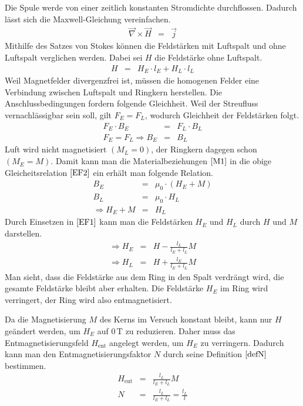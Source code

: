 \documentclass[12pt,a4paper]{scrartcl}
\numberwithin{equation}{section} %
\newcommand{\pu}[1]{\ensuremath{\mathrm{#1}}}
\renewcommand{\[}{} %
\renewcommand{\]}{\noindent} %
\begin{document}
Die Spule werde von einer zeitlich konstanten Stromdichte durchflossen. Dadurch lässt sich die Maxwell-Gleichung vereinfachen.
\begin{eqnarray}
    \vec \nabla \times \vec H &=& \vec j
\end{eqnarray}
Mithilfe des Satzes von Stokes können die Feldstärken mit Luftspalt und ohne Luftspalt verglichen werden. Dabei sei \(H\) die Feldstärke ohne Luftspalt. 
\begin{eqnarray}
    H &=& H_E\cdot l_E + H_L \cdot l_L \label{EF1}
\end{eqnarray}
Weil Magnetfelder divergenzfrei ist, müssen die homogenen Felder eine Verbindung zwischen Luftspalt und Ringkern herstellen. Die Anschlussbedingungen fordern folgende Gleichheit. Weil der Streufluss vernachlässigbar sein soll, gilt \(F_E = F_L\), wodurch Gleichheit der Feldstärken folgt.
\begin{eqnarray}
    F_E\cdot B_E &=& F_L\cdot B_L \nonumber \\
    F_E = F_L \Rightarrow B_E &=& B_L \label{EF2}
\end{eqnarray}
Luft wird nicht magnetisiert \((M_L=0)\), der Ringkern dagegen schon \((M_E=M)\). Damit kann man die Materialbeziehungen \(\eqref{M1}\) in die obige Gleicheitsrelation \(\eqref{EF2}\) ein erhält man folgende Relation.
\begin{eqnarray}
    B_E &=& \mu_0 \cdot \left(H_E + M\right) \nonumber \\
    B_L &=& \mu_0 \cdot H_L \nonumber \\
    \Rightarrow H_E + M &=& H_L \label{EF3}
\end{eqnarray}
Durch Einsetzen in \(\eqref{EF1}\) kann man die Feldstärken \(H_E\) und \(H_L\) durch \(H\) und \(M\) darstellen. 
\begin{eqnarray}
    \Rightarrow H_E &=& H - \frac{l_L}{l_E+l_L} M \\
    \Rightarrow H_L &=& H + \frac{l_E}{l_E+l_L} M
\end{eqnarray}
Man sieht, dass die Feldstärke aus dem Ring in den Spalt verdrängt wird, die gesamte Feldstärke bleibt aber erhalten. Die Feldstärke \(H_E\) im Ring wird verringert, der Ring wird also entmagnetisiert.

Da die Magnetisierung \(M\) des Kerns im Versuch konstant bleibt, kann nur \(H\) geändert werden, um \(H_E\) auf \(\pu{0\,T}\) zu reduzieren. Daher muss das Entmagnetisierungsfeld \(H_\mathrm{ent}\) angelegt 
werden, um \(H_E\) zu verringern. Dadurch kann man den Entmagnetisierungsfaktor \(N\) durch seine Definition \(\eqref{defN}\) bestimmen. 
\begin{eqnarray}
    H_\mathrm{ent} &=& \frac{l_L}{l_E+l_L} M \\
    N &=& \frac{l_L}{l_E+l_L} = \frac{l_L}{l}
\end{eqnarray}
\end{document}
